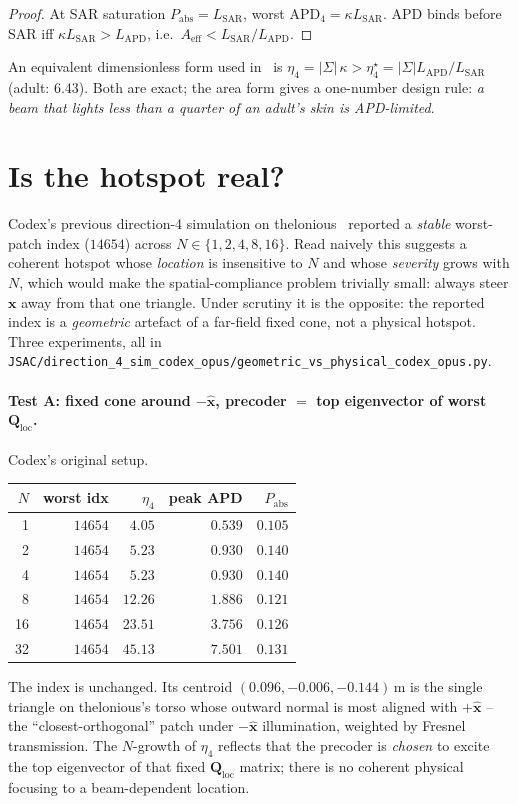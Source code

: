 \documentclass[journal]{IEEEtran}
\newcommand{\xx}{\bm{x}}
\newcommand{\APD}{\mathrm{APD}}
\newcommand{\Pabs}{P_{\mathrm{abs}}}
\newcommand{\Q}{\mathbf{Q}}
\newcommand{\Qloc}{\Q_{\mathrm{loc}}}
\newcommand{\Aeff}{A_{\mathrm{eff}}}
\newcommand{\SAR}{\mathrm{SAR}}
\begin{document}
\begin{proof}
At SAR saturation $\Pabs\!=\!L_{\SAR}$, worst $\APD_4\!=\!\kappa L_{\SAR}$.
APD binds before SAR iff $\kappa L_{\SAR}\!>\!L_{\APD}$, i.e.\
$\Aeff\!<\!L_{\SAR}/L_{\APD}$.
\end{proof}

An equivalent dimensionless form used
in~\cite{Codex2026} is
$\eta_4=|\Sigma|\,\kappa\!>\!\eta_4^\star\!=\!|\Sigma|L_{\APD}/L_{\SAR}$
(adult: $6.43$). Both are exact; the area form gives a one-number
design rule: \emph{a beam that lights less than a quarter of an adult's
skin is APD-limited}.

\section{Is the hotspot real?}\label{sec:real}

Codex's previous direction-4 simulation on
thelonious~\cite{Codex2026} reported a \emph{stable} worst-patch
index ($14654$) across $N\!\in\!\{1,2,4,8,16\}$. Read naively this
suggests a coherent hotspot whose \emph{location} is insensitive to
$N$ and whose \emph{severity} grows with $N$, which would make the
spatial-compliance problem trivially small: always steer $\xx$ away
from that one triangle. Under scrutiny it is the opposite: the
reported index is a \emph{geometric} artefact of a far-field fixed
cone, not a physical hotspot. Three experiments, all in
\verb|JSAC/direction_4_sim_codex_opus/geometric_vs_physical_codex_opus.py|.

\paragraph{Test A: fixed cone around $-\hat{\bm x}$, precoder
$=$ top eigenvector of worst $\Qloc$.} Codex's original setup.
\begin{center}\small
\begin{tabular}{rrrrr}
\toprule
$N$ & worst idx & $\eta_4$ & peak APD & $\Pabs$ \\ \midrule
 1 & $14654$ & $4.05$  & $0.539$ & $0.105$ \\
 2 & $14654$ & $5.23$  & $0.930$ & $0.140$ \\
 4 & $14654$ & $5.23$  & $0.930$ & $0.140$ \\
 8 & $14654$ & $12.26$ & $1.886$ & $0.121$ \\
16 & $14654$ & $23.51$ & $3.756$ & $0.126$ \\
32 & $14654$ & $45.13$ & $7.501$ & $0.131$ \\
\bottomrule
\end{tabular}
\end{center}
The index is unchanged. Its centroid $(0.096,-0.006,-0.144)$\,m is
the single triangle on thelonious's torso whose outward normal is most
aligned with $+\hat{\bm x}$ -- the ``closest-orthogonal'' patch under
$-\hat{\bm x}$ illumination, weighted by Fresnel transmission. The
$N$-growth of $\eta_4$ reflects that the precoder is \emph{chosen} to
excite the top eigenvector of that fixed $\Qloc$ matrix; there is no
coherent physical focusing to a beam-dependent location.
\end{document}
